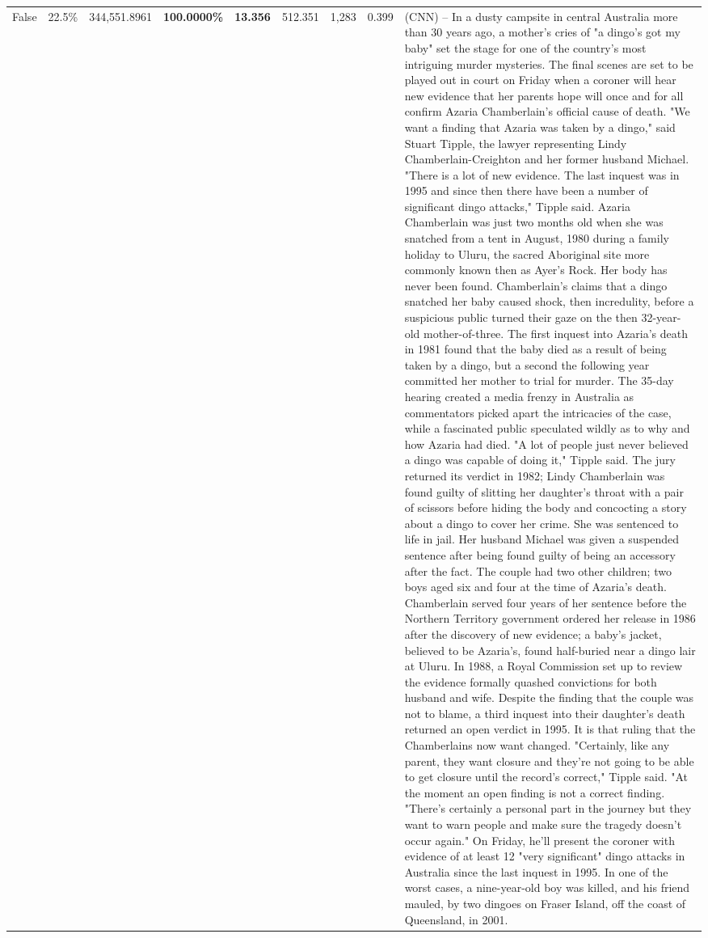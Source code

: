 \begin{table}[H]
\begin{tabular}{lllrlllll}
False & 22.5\% & 344,551.8961 & \bfseries \color{red} 100.0000\% & \bfseries \color{red} 13.356 & 512.351 & 1,283 & 0.399 & (CNN) -- In a dusty campsite in central Australia more than 30 years ago, a mother's cries of "a dingo's got my baby" set the stage for one of the country's most intriguing murder mysteries. The final scenes are set to be played out in court on Friday when a coroner will hear new evidence that her parents hope will once and for all confirm Azaria Chamberlain's official cause of death. "We want a finding that Azaria was taken by a dingo," said Stuart Tipple, the lawyer representing Lindy Chamberlain-Creighton and her former husband Michael. "There is a lot of new evidence. The last inquest was in 1995 and since then there have been a number of significant dingo attacks," Tipple said. Azaria Chamberlain was just two months old when she was snatched from a tent in August, 1980 during a family holiday to Uluru, the sacred Aboriginal site more commonly known then as Ayer's Rock. Her body has never been found. Chamberlain's claims that a dingo snatched her baby caused shock, then incredulity, before a suspicious public turned their gaze on the then 32-year-old mother-of-three. The first inquest into Azaria's death in 1981 found that the baby died as a result of being taken by a dingo, but a second the following year committed her mother to trial for murder. The 35-day hearing created a media frenzy in Australia as commentators picked apart the intricacies of the case, while a fascinated public speculated wildly as to why and how Azaria had died. "A lot of people just never believed a dingo was capable of doing it," Tipple said. The jury returned its verdict in 1982; Lindy Chamberlain was found guilty of slitting her daughter's throat with a pair of scissors before hiding the body and concocting a story about a dingo to cover her crime. She was sentenced to life in jail. Her husband Michael was given a suspended sentence after being found guilty of being an accessory after the fact. The couple had two other children; two boys aged six and four at the time of Azaria's death. Chamberlain served four years of her sentence before the Northern Territory government ordered her release in 1986 after the discovery of new evidence; a baby's jacket, believed to be Azaria's, found half-buried near a dingo lair at Uluru. In 1988, a Royal Commission set up to review the evidence formally quashed convictions for both husband and wife. Despite the finding that the couple was not to blame, a third inquest into their daughter's death returned an open verdict in 1995. It is that ruling that the Chamberlains now want changed. "Certainly, like any parent, they want closure and they're not going to be able to get closure until the record's correct," Tipple said. "At the moment an open finding is not a correct finding. "There's certainly a personal part in the journey but they want to warn people and make sure the tragedy doesn't occur again." On Friday, he'll present the coroner with evidence of at least 12 "very significant" dingo attacks in Australia since the last inquest in 1995. In one of the worst cases, a nine-year-old boy was killed, and his friend mauled, by two dingoes on Fraser Island, off the coast of Queensland, in 2001. 
\end{tabular}
\end{table}
